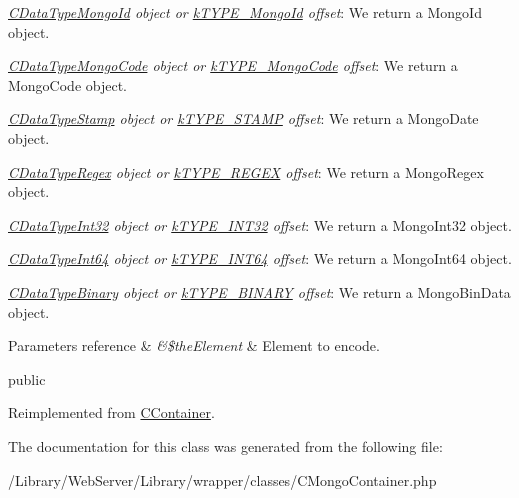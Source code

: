 \begin{DoxyItemize}
\item {\itshape \hyperlink{class_c_data_type_mongo_id}{C\-Data\-Type\-Mongo\-Id} object or \hyperlink{}{k\-T\-Y\-P\-E\-\_\-\-Mongo\-Id} offset}\-: We return a Mongo\-Id object. 
\item {\itshape \hyperlink{class_c_data_type_mongo_code}{C\-Data\-Type\-Mongo\-Code} object or \hyperlink{}{k\-T\-Y\-P\-E\-\_\-\-Mongo\-Code} offset}\-: We return a Mongo\-Code object. 
\item {\itshape \hyperlink{class_c_data_type_stamp}{C\-Data\-Type\-Stamp} object or \hyperlink{}{k\-T\-Y\-P\-E\-\_\-\-S\-T\-A\-M\-P} offset}\-: We return a Mongo\-Date object. 
\item {\itshape \hyperlink{class_c_data_type_regex}{C\-Data\-Type\-Regex} object or \hyperlink{}{k\-T\-Y\-P\-E\-\_\-\-R\-E\-G\-E\-X} offset}\-: We return a Mongo\-Regex object. 
\item {\itshape \hyperlink{class_c_data_type_int32}{C\-Data\-Type\-Int32} object or \hyperlink{}{k\-T\-Y\-P\-E\-\_\-\-I\-N\-T32} offset}\-: We return a Mongo\-Int32 object. 
\item {\itshape \hyperlink{class_c_data_type_int64}{C\-Data\-Type\-Int64} object or \hyperlink{}{k\-T\-Y\-P\-E\-\_\-\-I\-N\-T64} offset}\-: We return a Mongo\-Int64 object. 
\item {\itshape \hyperlink{class_c_data_type_binary}{C\-Data\-Type\-Binary} object or \hyperlink{}{k\-T\-Y\-P\-E\-\_\-\-B\-I\-N\-A\-R\-Y} offset}\-: We return a Mongo\-Bin\-Data object. 
\end{DoxyItemize}


\begin{DoxyParams}[1]{Parameters}
reference & {\em \&\$the\-Element} & Element to encode.\\
\hline
\end{DoxyParams}
public 

Reimplemented from \hyperlink{class_c_container_a09d585e2a9809221a42d52d7520c9cbf}{C\-Container}.



The documentation for this class was generated from the following file\-:\begin{DoxyCompactItemize}
\item 
/\-Library/\-Web\-Server/\-Library/wrapper/classes/C\-Mongo\-Container.\-php\end{DoxyCompactItemize}
